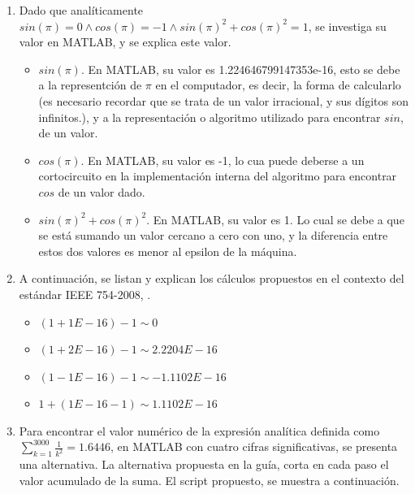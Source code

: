 \documentclass[11pt, spanish]{article}
\begin{document}
\begin{enumerate}
\item Dado que analíticamente $sin(\pi) = 0 \wedge cos(\pi) = -1 \wedge sin(\pi)^2 + cos(\pi)^2 = 1$, se investiga su valor en \textsc{MATLAB}, y se explica este valor.

\begin{itemize}
\item $sin(\pi)$. En \textsc{MATLAB}, su valor es 1.224646799147353e-16, esto se debe a la representción de $\pi$ en el computador, es decir, la forma de calcularlo (es necesario recordar que se trata de un valor irracional, y sus dígitos son infinitos.), y a la representación o algoritmo utilizado para encontrar $sin$, de un valor.
\item $cos(\pi)$. En \textsc{MATLAB}, su valor es -1, lo cua puede deberse a un cortocircuito en la implementación interna del algoritmo para encontrar $cos$ de un valor dado.
\item $sin(\pi)^2 + cos(\pi)^2$. En \textsc{MATLAB}, su valor es 1. Lo cual se debe a que se está sumando un valor cercano a cero con uno, y la diferencia entre estos dos valores es menor al epsilon de la máquina.
\end{itemize}

\item A continuación, se listan y explican los cálculos propuestos en el contexto del estándar IEEE 754-2008, \cite{ieeestd}.

\begin{itemize}
\item $(1 + 1E-16) - 1 \sim 0$
\item $(1 + 2E-16) - 1 \sim 2.2204E-16$
\item $(1 - 1E-16) - 1 \sim -1.1102E-16$
\item $1 + (1E-16 - 1) \sim 1.1102E-16$
\end{itemize}

\item Para encontrar el valor numérico de la expresión analítica definida como $\sum_{k=1}^{3000} \frac{1}{k^2} =  1.6446$, en \textsc{MATLAB} con cuatro cifras significativas, se presenta una alternativa. La alternativa propuesta en la guía, corta en cada paso el valor acumulado de la suma. El script propuesto, se muestra a continuación.




\end{enumerate}
\end{document}
